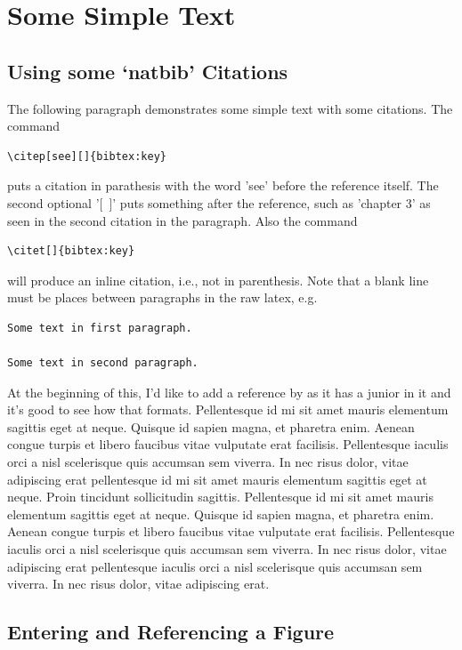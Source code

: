 \chapter{Some Simple Text}

\section{Using some `natbib' Citations}

The following paragraph demonstrates some simple text with some citations. The
command
\begin{verbatim}
\citep[see][]{bibtex:key}
\end{verbatim}
puts a citation in parathesis with the word 'see' before the
reference itself. The second optional '[~]' puts something after the reference,
such as 'chapter 3' as seen in the second citation in the paragraph. Also the
command
\begin{verbatim}
\citet[]{bibtex:key}
\end{verbatim}
will produce an inline citation, i.e., not in parenthesis. Note that a blank
line must be places between paragraphs in the raw latex, e.g.
\begin{verbatim}
Some text in first paragraph.

Some text in second paragraph.
\end{verbatim}

At the beginning of this, I'd like to add a reference by \citet{Afjeh:1986:JoFE}
as it has a junior in it and it's good to see how that formats. Pellentesque id
mi sit amet mauris elementum sagittis eget at neque. Quisque id sapien magna, et
pharetra enim. Aenean congue turpis et libero faucibus vitae vulputate erat
facilisis. Pellentesque iaculis orci a nisl scelerisque quis accumsan sem
viverra. In nec risus dolor, vitae adipiscing erat
\citep[see][]{Solomon:2007:CUP} pellentesque id mi sit amet mauris elementum
sagittis eget at neque. Proin tincidunt sollicitudin sagittis. Pellentesque id
mi sit amet mauris elementum sagittis eget at neque. Quisque id sapien magna, et
pharetra enim. Aenean congue turpis et libero faucibus vitae vulputate erat
facilisis. Pellentesque iaculis orci a nisl scelerisque quis accumsan sem
viverra. In nec risus dolor, vitae adipiscing erat
\citep[see][]{Jaccard:2005:CUP} pellentesque iaculis orci a nisl scelerisque
quis accumsan sem viverra. In nec risus dolor, vitae adipiscing erat.

\section{Entering and Referencing a Figure}

